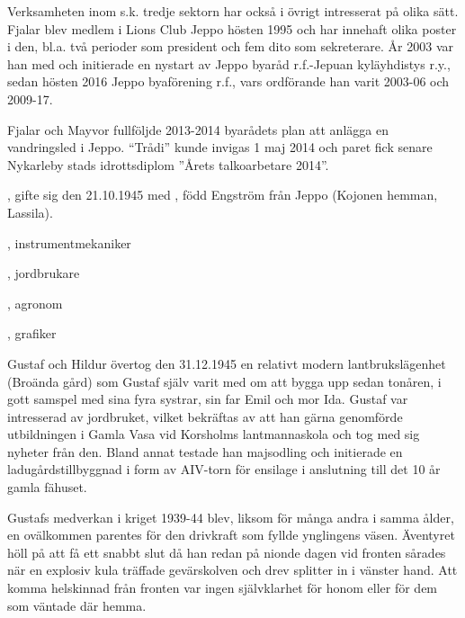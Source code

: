 Verksamheten inom s.k. tredje sektorn har också i övrigt intresserat på olika sätt. Fjalar blev medlem i Lions Club Jeppo hösten 1995 och har innehaft olika poster i den, bl.a. två perioder som president och fem dito som sekreterare. År 2003 var han med och initierade en nystart av Jeppo byaråd r.f.-Jepuan kyläyhdistys r.y., sedan hösten 2016 Jeppo byaförening r.f., vars ordförande han varit 2003-06 och 2009-17.

Fjalar och Mayvor fullföljde 2013-2014 byarådets plan att anlägga en vandringsled i Jeppo. ``Trådi'' kunde invigas 1 maj 2014 och paret fick senare Nykarleby stads idrottsdiplom ”Årets talkoarbetare 2014”.




, gifte sig den 21.10.1945 med , född Engström från Jeppo (Kojonen hemman, Lassila).


\begin{jhchildren}
  \item {}, instrumentmekaniker
  \item {}, jordbrukare
  \item {}, agronom
  \item {}, grafiker
\end{jhchildren}

Gustaf och Hildur övertog den 31.12.1945 en relativt modern lantbrukslägenhet (Broända gård) som Gustaf själv varit med om att bygga upp sedan tonåren, i gott samspel med sina fyra systrar, sin far Emil och mor Ida. Gustaf var intresserad av jordbruket, vilket bekräftas av att han gärna genomförde utbildningen i Gamla Vasa vid Korsholms lantmannaskola och tog med sig nyheter från den. Bland annat testade han majsodling och initierade en ladugårdstillbyggnad i form av AIV-torn för ensilage i anslutning till det 10 år gamla fähuset.

Gustafs medverkan i kriget 1939-44 blev, liksom för många andra i samma ålder, en ovälkommen parentes för den drivkraft som fyllde ynglingens väsen. Äventyret höll på att få ett snabbt slut då han redan på nionde dagen vid fronten sårades när en explosiv kula träffade gevärskolven och drev splitter in i vänster hand. Att komma helskinnad från fronten var ingen självklarhet för honom eller för dem som väntade där hemma.

